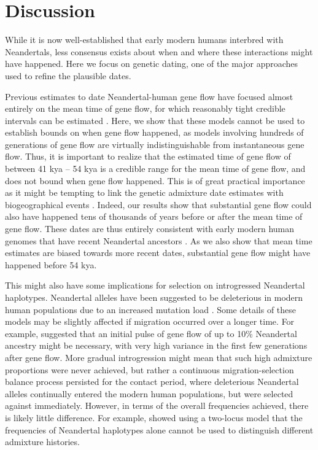 \documentclass[]{article}
\begin{document}
\section{Discussion}\label{discussion}
While it is now well-established that early modern humans interbred with Neandertals, less consensus exists about when and where these interactions might have happened. Here we focus on genetic dating, one of the major approaches used to refine the plausible dates.

Previous estimates to date Neandertal-human gene flow have focused almost entirely on the mean time of gene flow, for which reasonably tight credible intervals can be estimated \citep{green_draft_2010, sankararaman_date_2012}. Here, we show that these models cannot be used to establish bounds on when gene flow happened, as models involving hundreds of generations of gene flow are virtually indistinguishable from instantaneous gene flow. Thus, it is important to realize that the estimated time of gene flow of between 41 kya -- 54 kya \citep{moorjani_genetic_2016} is a credible range for the mean time of gene flow, and does not bound when gene flow happened. This is of great practical importance as it might be tempting to link the genetic admixture date estimates with biogeographical events \citep{sankararaman_date_2012,lazaridis_genomic_2016,jacobs_multiple_2019,vyas_analyses_2019,douka_age_2019}. Indeed, our results show that substantial gene flow could also have happened tens of thousands of years before or after the mean time of gene flow. These dates are thus entirely consistent with early modern human genomes that have recent Neandertal ancestors \citep{fu_genome_2014, hajdinjak_early_2021}. As we also show that mean time estimates are biased towards more recent dates, substantial gene flow might have happened before 54 kya. 

This might also have some implications for selection on introgressed Neandertal haplotypes. Neandertal alleles have been suggested to be deleterious in modern human populations due to an increased mutation load \citep{harris_genetic_2016, juric_strength_2016}. Some details of these models may be slightly affected if migration occurred over a longer time. For example, \cite{harris_genetic_2016} suggested that an initial pulse of gene flow of up to 10\% Neandertal ancestry might be necessary, with very high variance in the first few generations after gene flow. More gradual introgression might mean that such high admixture proportions were never achieved, but rather a continuous migration-selection balance process persisted for the contact period, where deleterious Neandertal alleles continually entered the modern human populations, but were selected against immediately. 
However, in terms of the overall frequencies achieved, there is likely little difference. For example, \cite{juric_strength_2016} showed using a two-locus model that the frequencies of Neandertal haplotypes alone cannot be used to distinguish different admixture histories.
\end{document}
